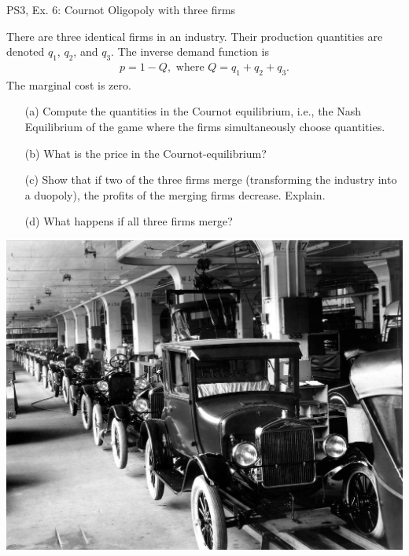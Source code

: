 \begin{frame}{PS3, Ex. 6: Cournot Oligopoly with three firms}
  \begin{multicols}{2}
    There are three identical firms in an industry. Their production quantities are denoted $q_1$, $q_2$, and $q_3$. The inverse demand function is
    \begin{align*}
      p=1-Q,\text{     where }Q=q_1+q_2+q_3.
    \end{align*}
    The marginal cost is zero.
    \begin{itemize}
      \item[(a)] Compute the quantities in the Cournot equilibrium, i.e., the Nash Equilibrium of the game where the firms simultaneously choose quantities.
      \item[(b)] What is the price in the Cournot-equilibrium?
      \item[(c)] Show that if two of the three firms merge (transforming the industry into a duopoly), the profits of the merging firms decrease. Explain.
      \item[(d)] What happens if all three firms merge?
    \end{itemize}
  \vfill\null \columnbreak
    \includegraphics[width=.5 \textwidth]{figures/ford}
  \vfill\null
  \end{multicols}
\end{frame}


